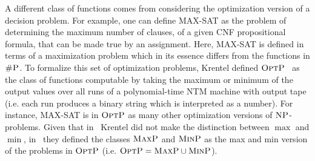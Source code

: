 A different class of functions comes from considering the optimization version of a decision problem. For example, one can define MAX-SAT as the problem of determining the maximum number of clauses, of a given CNF propositional formula, that can be made true by an assignment. Here, MAX-SAT is defined in terms of a maximization problem which in its essence differs from the functions in $\text{\sc \#P}$. 
To formalize this set of optimization problems, Krentel defined $\text{\sc OptP}$~\cite{krentel1988complexity} as the class of functions computable by taking the maximum or minimum of the output values over all runs of a polynomial-time NTM machine with output tape (i.e. each run produces a binary string which is interpreted as a number). 
For instance, MAX-SAT is in $\text{\sc OptP}$ as many other optimization versions of $\text{\sc NP}$-problems.
Given that in~\cite{krentel1988complexity} Krentel did not make the distinction between $\max$ and $\min$, in~\cite{vollmer1995complexity} they defined the classes $\text{\sc MaxP}$ and $\text{\sc MinP}$ as the max and min version of the problems in $\text{\sc OptP}$ (i.e. $\text{\sc OptP} = \text{\sc MaxP} \cup \text{\sc MinP}$).


